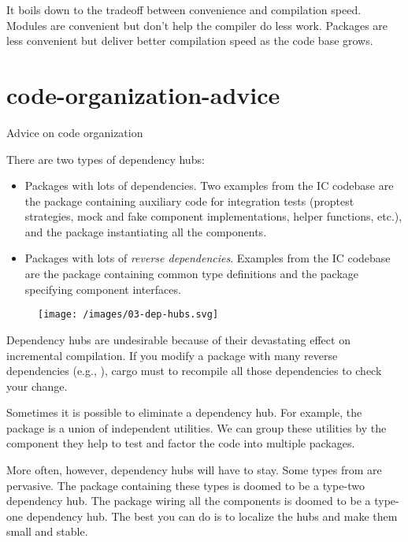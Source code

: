 \documentclass{article}
\begin{document}
It boils down to the tradeoff between convenience and compilation speed.
Modules are convenient but don't help the compiler do less work.
Packages are less convenient but deliver better compilation speed as the code base grows.

\section{code-organization-advice}{Advice on code organization}


There are two types of dependency hubs:
\begin{itemize}
\item 
  Packages with lots of dependencies.
  Two examples from the IC codebase are the  package containing auxiliary code for integration tests
  (proptest strategies, mock and fake component implementations, helper functions, etc.),
  and the  package instantiating all the components.
\item 
  Packages with lots of \emph{reverse dependencies}.
  Examples from the IC codebase are the  package containing common type definitions and the  package specifying component interfaces.
\end{itemize}

\begin{figure}[grayscale-diagram]
  \texttt{[image: /images/03-dep-hubs.svg]}
\end{figure}

Dependency hubs are undesirable because of their devastating effect on incremental compilation.
If you modify a package with many reverse dependencies (e.g., ), cargo must to recompile all those dependencies to check your change.

Sometimes it is possible to eliminate a dependency hub.
For example, the  package is a union of independent utilities.
We can group these utilities by the component they help to test and factor the code into multiple  packages.

More often, however, dependency hubs will have to stay.
Some types from  are pervasive.
The package containing these types is doomed to be a type-two dependency hub.
The  package wiring all the components is doomed to be a type-one dependency hub.
The best you can do is to localize the hubs and make them small and stable.
\end{document}
